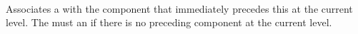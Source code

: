  \\

Associates a  with the component that immediately precedes this  at the current level. The  must  an  if there is no preceding component at the current level. \\

